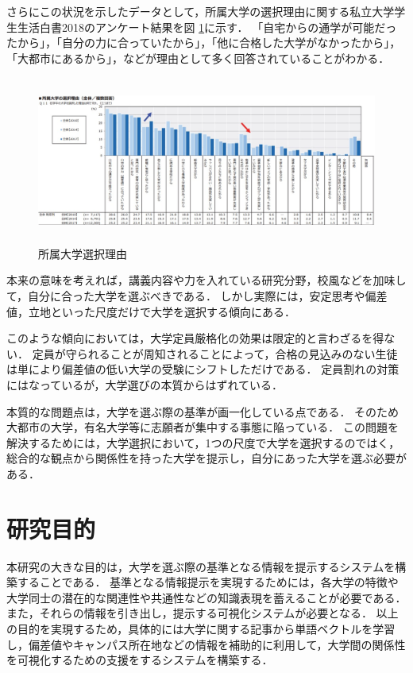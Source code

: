 さらにこの状況を示したデータとして，所属大学の選択理由に関する私立大学学生生活白書2018\cite{reason}のアンケート結果を図 \ref{fig:reason}に示す．
「自宅からの通学が可能だったから」，「自分の力に合っていたから」，「他に合格した大学がなかったから」，「大都市にあるから」，などが理由として多く回答されていることがわかる．
\begin{figure}[H]
\centering
\includegraphics[height=5.5cm]{images/SS.jpg}
\caption[所属大学選択理由]{所属大学選択理由 \cite{reason}}
\label{fig:reason}
\end{figure}
本来の意味を考えれば，講義内容や力を入れている研究分野，校風などを加味して，自分に合った大学を選ぶべきである．
しかし実際には，安定思考や偏差値，立地といった尺度だけで大学を選択する傾向にある．

このような傾向においては，大学定員厳格化の効果は限定的と言わざるを得ない．
定員が守られることが周知されることによって，合格の見込みのない生徒は単により偏差値の低い大学の受験にシフトしただけである．
定員割れの対策にはなっているが，大学選びの本質からはずれている．

本質的な問題点は，大学を選ぶ際の基準が画一化している点である．
そのため大都市の大学，有名大学等に志願者が集中する事態に陥っている．
この問題を解決するためには，大学選択において，1つの尺度で大学を選択するのではく，総合的な観点から関係性を持った大学を提示し，自分にあった大学を選ぶ必要がある．


\section{研究目的}
本研究の大きな目的は，大学を選ぶ際の基準となる情報を提示するシステムを構築することである．
基準となる情報提示を実現するためには，各大学の特徴や大学同士の潜在的な関連性や共通性などの知識表現を蓄えることが必要である．
また，それらの情報を引き出し，提示する可視化システムが必要となる．
以上の目的を実現するため，具体的には大学に関する記事から単語ベクトルを学習し，偏差値やキャンパス所在地などの情報を補助的に利用して，大学間の関係性を可視化するための支援をするシステムを構築する．

